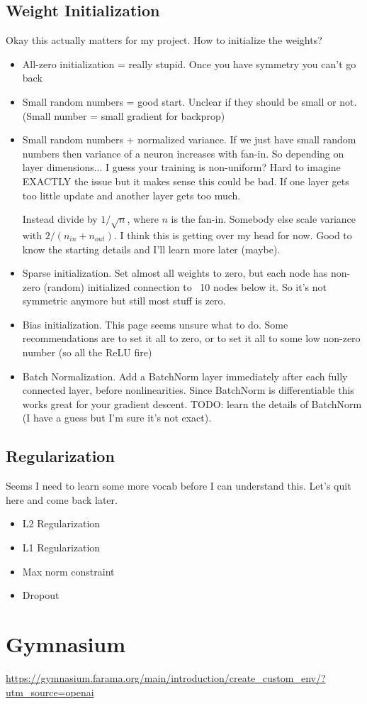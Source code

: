 \documentclass[11pt,notitlepage]{report}
\theoremstyle{definition}
\theoremstyle{plain}
\begin{document}
\section{Weight Initialization}

Okay this actually matters for my project. How to initialize the weights?
\begin{itemize}
\item All-zero initialization = really stupid. Once you have symmetry you can't go back
\item Small random numbers = good start. Unclear if they should be small or not. (Small number = small gradient for backprop)
\item Small random numbers + normalized variance.
If we just have small random numbers then variance of a neuron increases with fan-in.
So depending on layer dimensions... I guess your training is non-uniform? Hard to imagine
EXACTLY the issue but it makes sense this could be bad. If one layer gets too little update
and another layer gets too much.

Instead divide by $1/\sqrt{n}$, where $n$ is the fan-in. Somebody else scale variance with
$2/\left(n_{in} + n_{out}\right)$. I think this is getting over my head for now. Good to know
the starting details and I'll learn more later (maybe).
\item Sparse initialization. Set almost all weights to zero, but each node has non-zero (random)
initialized connection to ~10 nodes below it. So it's not symmetric anymore but still most stuff is zero.
\item Bias initialization. This page seems unsure what to do. Some recommendations are
to set it all to zero, or to set it all to some low non-zero number (so all the ReLU fire)
\item Batch Normalization. Add a BatchNorm layer immediately after each fully connected layer,
before nonlinearities. Since BatchNorm is differentiable this works great for your gradient
descent. TODO: learn the details of BatchNorm (I have a guess but I'm sure it's not exact).
\end{itemize}

\section{Regularization}

Seems I need to learn some more vocab before I can understand this.
Let's quit here and come back later.

\begin{itemize}
\item L2 Regularization
\item L1 Regularization
\item Max norm constraint
\item Dropout
\end{itemize}

\chapter{Gymnasium}
\url{https://gymnasium.farama.org/main/introduction/create_custom_env/?utm_source=openai}
\end{document}

